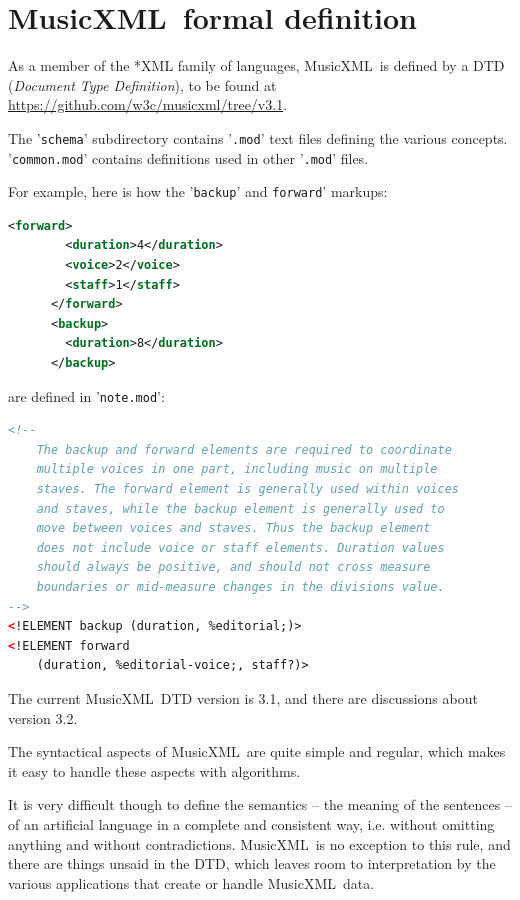 \documentclass[12pt,a4paper]{article}
\newcommand{\mxml}{MusicXML}
\begin{document}
\section{\mxml\ formal definition}

As a member of the *XML family of languages, \mxml\ is defined by a DTD ({\it Document Type Definition}), to be found at \url{https://github.com/w3c/musicxml/tree/v3.1}. 

The '{\tt schema}' subdirectory contains '{\tt *.mod}' text files defining the various concepts. {'\tt common.mod}' contains definitions used in other {'\tt *.mod}' files.

For example, here is how the '{\tt backup}' and {\tt forward}' markups:
\begin{lstlisting}[language=XML, caption=$<$backup$>$ and $<$forward$>$ example]
      <forward>
        <duration>4</duration>
        <voice>2</voice>
        <staff>1</staff>
      </forward>
      <backup>
        <duration>8</duration>
      </backup>
\end{lstlisting}

are defined in '{\tt note.mod}':
\begin{lstlisting}[language=XML, caption=$<$backup$>$ and $<$forward$>$ definition]
<!--
	The backup and forward elements are required to coordinate
	multiple voices in one part, including music on multiple
	staves. The forward element is generally used within voices
	and staves, while the backup element is generally used to
	move between voices and staves. Thus the backup element
	does not include voice or staff elements. Duration values
	should always be positive, and should not cross measure
	boundaries or mid-measure changes in the divisions value.
-->
<!ELEMENT backup (duration, %editorial;)>
<!ELEMENT forward
	(duration, %editorial-voice;, staff?)>
\end{lstlisting}

The current \mxml\ DTD version is 3.1, and there are discussions about version 3.2.

The syntactical aspects of \mxml\ are quite simple and regular, which makes it easy to handle these aspects with algorithms.

It is very difficult though to define the semantics -- the meaning of the sentences -- of an artificial language in a complete and consistent way, i.e. without omitting anything and without contradictions. \mxml\ is no exception to this rule, and there are things unsaid in the DTD, which leaves room to interpretation by the various applications that create or handle \mxml\ data.
\end{document}
